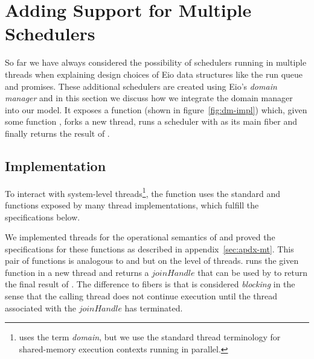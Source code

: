 \section{Adding Support for Multiple Schedulers}
\label{sec:domain-manager}

So far we have always considered the possibility of schedulers running in multiple threads when explaining design choices of Eio data structures like the run queue and promises.
These additional schedulers are created using Eio's \emph{domain manager} and in this section we discuss how we integrate the domain manager into our model.
It exposes a function  (shown in figure~\ref{fig:dm-impl}) which, given some function , forks a new thread, runs a scheduler with  as its main fiber and finally returns the result of .

\subsection{Implementation}
To interact with system-level threads\footnote{\ocf{} uses the term \emph{domain}, but we use the standard thread terminology for shared-memory execution contexts running in parallel.},
the function uses the standard  and  functions exposed by many thread implementations, which fulfill the specifications below.
%
We implemented threads for the operational semantics of \hh{} and proved the specifications for these functions as described in appendix~\ref{sec:apdx-mt}.
This pair of functions is analogous to  and  but on the level of threads.
 runs the given function  in a new thread and returns a \(joinHandle\) that can be used by  to return the final result of .
The difference to fibers is that  is considered \emph{blocking} in the sense that the calling thread does not continue execution until the thread associated with the \(joinHandle\) has terminated.

